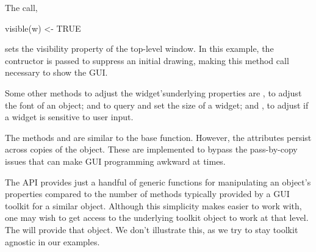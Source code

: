 The call, 
\begin{Schunk}
\begin{Sinput}
 visible(w) <- TRUE
\end{Sinput}
\end{Schunk}
%
sets the visibility property of the top-level window. In this example,
the  contructor is passed  to
suppress an initial drawing, making this method call necessary to show
the GUI.

Some other methods to adjust the widget'sunderlying properties are ,
to adjust the font of an object;  and  to
query and set the size of a widget; and , to adjust
if a widget is sensitive to user input. 

The methods  and
 are similar to the base 
function. However, the attributes persist across copies of the
object. These are implemented to bypass the pass-by-copy issues that
can make GUI programming awkward at times.

The  API provides just a handful of generic functions
for manipulating an object's properties compared to the number of
methods typically provided by a GUI toolkit for a similar
object. Although this simplicity makes  easier to work
with, one may wish to get access to the underlying toolkit object to
work at that level. The  will provide that
object. We don't illustrate this, as we try to stay toolkit agnostic
in our examples.


